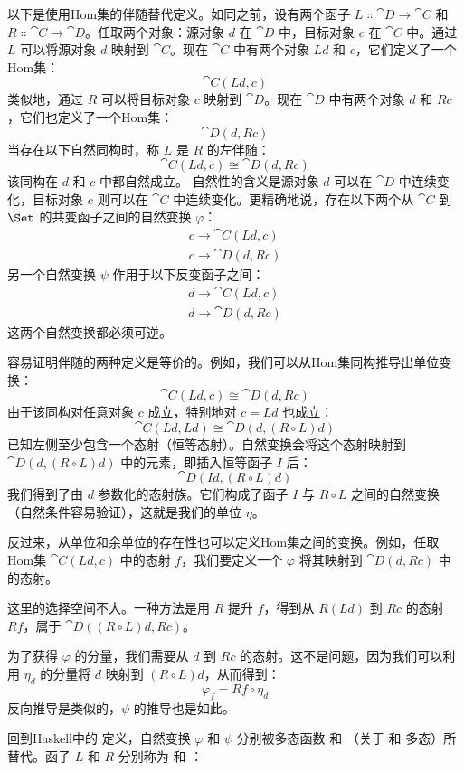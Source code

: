 \noindent
以下是使用Hom集的伴随替代定义。如同之前，设有两个函子 $L \Colon \cat{D} \to \cat{C}$ 和 $R \Colon \cat{C} \to \cat{D}$。任取两个对象：源对象 $d$ 在 $\cat{D}$ 中，目标对象 $c$ 在 $\cat{C}$ 中。通过 $L$ 可以将源对象 $d$ 映射到 $\cat{C}$。现在 $\cat{C}$ 中有两个对象 $L d$ 和 $c$，它们定义了一个Hom集：
\[\cat{C}(L d, c)\]
类似地，通过 $R$ 可以将目标对象 $c$ 映射到 $\cat{D}$。现在 $\cat{D}$ 中有两个对象 $d$ 和 $R c$，它们也定义了一个Hom集：
\[\cat{D}(d, R c)\]
当存在以下自然同构时，称 $L$ 是 $R$ 的左伴随：
\[\cat{C}(L d, c) \cong \cat{D}(d, R c)\]
该同构在 $d$ 和 $c$ 中都自然成立。
自然性的含义是源对象 $d$ 可以在 $\cat{D}$ 中连续变化，目标对象 $c$ 则可以在 $\cat{C}$ 中连续变化。更精确地说，存在以下两个从 $\cat{C}$ 到 $\Set$ 的共变函子之间的自然变换 $\varphi$：
\begin{gather*}
  c \to \cat{C}(L d, c) \\
  c \to \cat{D}(d, R c)
\end{gather*}
另一个自然变换 $\psi$ 作用于以下反变函子之间：
\begin{gather*}
  d \to \cat{C}(L d, c) \\
  d \to \cat{D}(d, R c)
\end{gather*}
这两个自然变换都必须可逆。

容易证明伴随的两种定义是等价的。例如，我们可以从Hom集同构推导出单位变换：
\[\cat{C}(L d, c) \cong \cat{D}(d, R c)\]
由于该同构对任意对象 $c$ 成立，特别地对 $c = L d$ 也成立：
\[\cat{C}(L d, L d) \cong \cat{D}(d, (R \circ L) d)\]
已知左侧至少包含一个态射（恒等态射）。自然变换会将这个态射映射到 $\cat{D}(d, (R \circ L) d)$ 中的元素，即插入恒等函子 $I$ 后：
\[\cat{D}(I d, (R \circ L) d)\]
我们得到了由 $d$ 参数化的态射族。它们构成了函子 $I$ 与 $R \circ L$ 之间的自然变换（自然条件容易验证），这就是我们的单位 $\eta$。

反过来，从单位和余单位的存在性也可以定义Hom集之间的变换。例如，任取Hom集 $\cat{C}(L d, c)$ 中的态射 $f$，我们要定义一个 $\varphi$ 将其映射到 $\cat{D}(d, R c)$ 中的态射。

这里的选择空间不大。一种方法是用 $R$ 提升 $f$，得到从 $R (L d)$ 到 $R c$ 的态射 $R f$，属于 $\cat{D}((R \circ L) d, R c)$。

为了获得 $\varphi$ 的分量，我们需要从 $d$ 到 $R c$ 的态射。这不是问题，因为我们可以利用 $\eta_d$ 的分量将 $d$ 映射到 $(R \circ L) d$，从而得到：
\[\varphi_f = R f \circ \eta_d\]
反向推导是类似的，$\psi$ 的推导也是如此。

回到Haskell中的  定义，自然变换 $\varphi$ 和 $\psi$ 分别被多态函数  和 （关于  和  多态）所替代。函子 $L$ 和 $R$ 分别称为  和 ：

